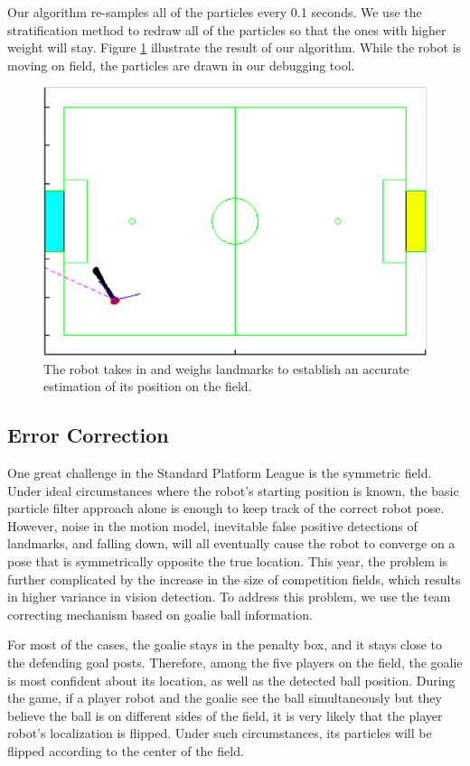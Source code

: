 \documentclass{article}
\begin{document}
	  Our algorithm re-samples all of the particles every 0.1 seconds. We use the stratification method to redraw all of the particles so that the ones with higher weight will stay. Figure \ref{fig:particlesafter} illustrate the result of our algorithm. While the robot is moving on field, the particles are drawn in our debugging tool.
    \begin{figure}[H]
		  \centering
  	  \includegraphics[width=.6\textwidth]{figures/FocusedParticles.eps}
	  	\caption{The robot takes in and weighs landmarks to establish an accurate estimation of its position on the field.}
		  \label{fig:particlesafter}
  	\end{figure}


  \subsection{Error Correction}
	  One great challenge in the Standard Platform League is the symmetric field. Under ideal circumstances where the robot's starting position is known, the basic particle filter approach alone is enough to keep track of the correct robot pose. However, noise in the motion model, inevitable false positive detections of landmarks, and falling down, will all eventually cause the robot to converge on a pose that is symmetrically opposite the true location. This year, the problem is further complicated by the increase in the size of competition fields, which results in higher variance in vision detection. To address this problem, we use the team correcting mechanism based on goalie ball information.

	  For most of the cases, the goalie stays in the penalty box, and it stays close to the defending goal posts. Therefore, among the five players on the field, the goalie is most confident about its location, as well as the detected ball position. During the game, if a player robot and the goalie see the ball simultaneously but they believe the ball is on different sides of the field, it is very likely that the player robot's localization is flipped. Under such circumstances, its particles will be flipped according to the center of the field.
\end{document}
